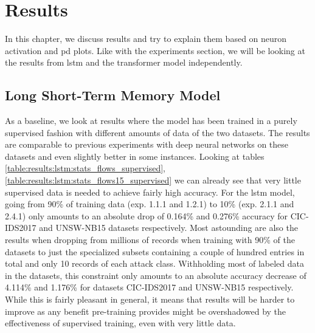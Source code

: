 \chapter{Results} \label{sec:results}

In this chapter, we discuss results and try to explain them based on neuron activation and \gls{pd} plots. Like with the experiments section, we will be looking at the results from \gls{lstm} and the transformer model independently.

\section{Long Short-Term Memory Model} \label{sec:results:lstm}

As a baseline, we look at results where the model has been trained in a purely supervised fashion with different amounts of data of the two datasets. The results are comparable to previous experiments with deep neural networks on these datasets \cite{fog_based_detection_survey_2020} and even slightly better in some instances. Looking at tables \ref{table:results:lstm:stats_flows_supervised}, \ref{table:results:lstm:stats_flows15_supervised} we can already see that very little supervised data is needed to achieve fairly high accuracy. For the \gls{lstm} model, going from 90\% of training data (exp. 1.1.1 and 1.2.1) to 10\% (exp. 2.1.1 and 2.4.1) only amounts to an absolute drop of 0.164\% and 0.276\% accuracy for CIC-IDS2017 and UNSW-NB15 datasets respectively. Most astounding are also the results when dropping from millions of records when training with 90\% of the datasets to just the specialized subsets containing a couple of hundred entries in total and only 10 records of each attack class. Withholding most of labeled data in the datasets, this constraint only amounts to an absolute accuracy decrease of 4.114\% and 1.176\% for datasets CIC-IDS2017 and UNSW-NB15 respectively.
While this is fairly pleasant in general, it means that results will be harder to improve as any benefit pre-training provides might be overshadowed by the effectiveness of supervised training, even with very little data. \par







